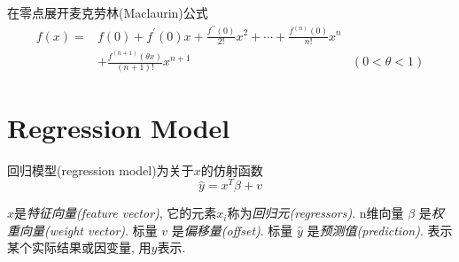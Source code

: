\begin{corollary}在零点展开麦克劳林(Maclaurin)公式
    $$ \begin{aligned} f(x)=& f(0)+f^{\prime}(0) x+\frac{f^{\prime \prime}(0)}{2 !} x^{2}+\cdots+\frac{f^{(n)}(0)}{n !} x^{n} \\ &+\frac{f^{(n+1)}(\theta x)}{(n+1) !} x^{n+1} &(0<\theta<1) \end{aligned} $$
    
\end{corollary}


\section{Regression Model}
\begin{definition}
    回归模型(regression model)为关于$x$的仿射函数
    $$ \hat{y}=x^{T} \beta+v $$

    $x$是\textit{特征向量(feature vector)}, 它的元素$x_i$称为\textit{回归元(regressors)}. n维向量 $ \beta $ 是\textit{权重向量(weight vector)}. 标量 $ v $ 是\textit{偏移量(offset)}. 标量 $ \hat{y} $ 是\textit{预测值(prediction)}. 表示某个实际结果或因变量, 用$y$表示. 
\end{definition}